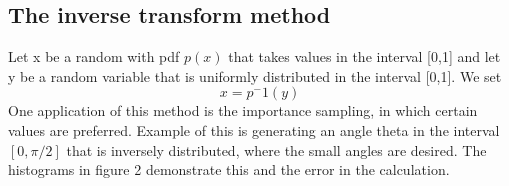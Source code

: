 \subsection{The inverse transform method} 

Let x be a random with pdf $p(x)$ that takes values in the interval [0,1] and let y be a random variable that is uniformly distributed in the interval [0,1]. We set
\begin{equation}
x = p^-1(y)
\end{equation}
One application of this method is the importance sampling, in which certain values are preferred\citep{Weinzierl}. Example of this is generating an angle theta in the interval $[0,\pi/2]$ that is inversely distributed, where the small angles are desired. The histograms in figure 2 demonstrate this and the error in the calculation.    

